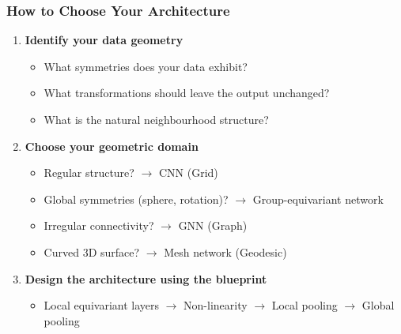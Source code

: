\begin{frame}[fragile]\frametitle{How to Choose Your Architecture}

\begin{enumerate}
  \item \textbf{Identify your data geometry}
    \begin{itemize}
      \item What symmetries does your data exhibit?
      \item What transformations should leave the output unchanged?
      \item What is the natural neighbourhood structure?
    \end{itemize}
  \item \textbf{Choose your geometric domain}
    \begin{itemize}
      \item Regular structure? $\rightarrow$ CNN (Grid)
      \item Global symmetries (sphere, rotation)? $\rightarrow$ Group-equivariant network
      \item Irregular connectivity? $\rightarrow$ GNN (Graph)
      \item Curved 3D surface? $\rightarrow$ Mesh network (Geodesic)
    \end{itemize}
  \item \textbf{Design the architecture using the blueprint}
    \begin{itemize}
      \item Local equivariant layers $\rightarrow$ Non-linearity $\rightarrow$ Local pooling $\rightarrow$ Global pooling
    \end{itemize}
\end{enumerate}

\end{frame}

